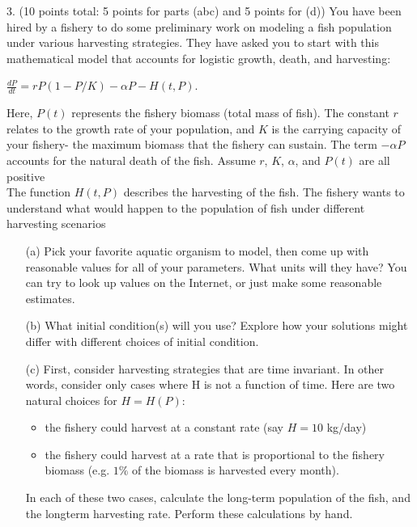 \documentclass[12pt,letterpaper]{hmcpset}
\begin{document}
\begin{problem}
3. (10 points total: 5 points for parts (abc) and 5 points for (d)) You have been hired by a
fishery to do some preliminary work on modeling a fish population under various harvesting
strategies. They have asked you to start with this mathematical model that accounts for
logistic growth, death, and harvesting:\\

\begin{center}
    $\frac{dP}{dt}= rP(1 - P/K)-\alpha P-H(t, P)$.
\end{center}

Here, $P(t)$ represents the fishery biomass (total mass of fish). The constant $r$ relates to
the growth rate of your population, and $K$ is the carrying capacity of your fishery- the
maximum biomass that the fishery can sustain. The term $-\alpha P$ accounts for the natural
death of the fish. Assume $r$, $K$, $\alpha$, and $P(t)$ are all positive\\

The function $H(t, P)$ describes the harvesting of the fish. The fishery wants to understand
what would happen to the population of fish under different harvesting scenarios

\begin{enumerate}
    \item[(a)]Pick your favorite aquatic organism to model, then come up with reasonable values for
all of your parameters. What units will they have? You can try to look up values on
the Internet, or just make some reasonable estimates.
    \item[(b)] What initial condition(s) will you use? Explore how your solutions might differ with
different choices of initial condition.
    \item[(c)] First, consider harvesting strategies that are time invariant. In other words, consider
only cases where H is not a function of time. Here are two natural choices for
$H = H(P)$:

\begin{itemize}
  \item the fishery could harvest at a constant rate (say $H = 10$ kg/day)
  \item the fishery could harvest at a rate that is proportional to the fishery biomass
(e.g. $1\%$ of the biomass is harvested every month).
\end{itemize}
In each of these two cases, calculate the long-term population of the fish, and the longterm
harvesting rate. Perform these calculations by hand.


\end{enumerate}
\end{problem}
\end{document}
